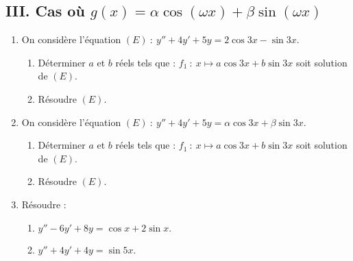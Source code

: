 \documentclass[12pt]{article}
\begin{document}
\subsection*{III. Cas où \(g(x)=\alpha\cos(\omega x)+\beta\sin(\omega x)\)}
\begin{enumerate}
    \item On considère l'équation \((E)\ :\ y''+4y'+5y=2\cos 3x-\sin 3x.\)
    \begin{enumerate}
        \item Déterminer \(a\) et \(b\) réels tels que :
        \(f_{1}\ :\ x\mapsto a\cos 3x+b\sin 3x\) soit solution de \((E).\) 
        \item Résoudre \((E).\) 
    \end{enumerate}
    \item On considère l'équation \((E)\ :\ y''+4y'+5y=\alpha\cos 3x+\beta\sin 3x.\)
    \begin{enumerate}
        \item Déterminer \(a\) et \(b\) réels tels que :
        \(f_{1}\ :\ x\mapsto a\cos 3x+b\sin 3x\) soit solution de \((E).\) 
        \item Résoudre \((E).\) 
    \end{enumerate}
    \item Résoudre :
    \begin{enumerate}
        \item \(y''-6y'+8y=\cos x+2\sin x.\)
        \item \(y''+4y'+4y=\sin 5x.\)
    \end{enumerate}
\end{enumerate}
\end{document}
